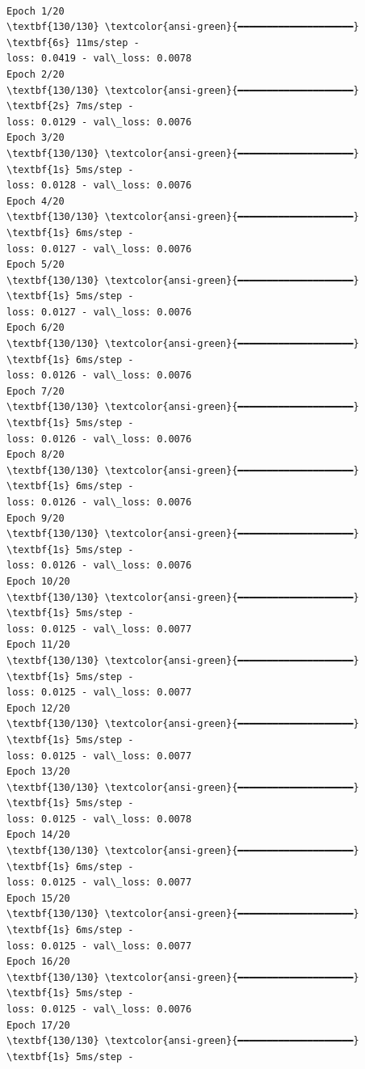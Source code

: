\documentclass[11pt]{article}
\begin{document}
    \begin{center}
    \end{center}
    { \hspace*{\fill} \\}
    
    \begin{Verbatim}[commandchars=\\\{\}]
Epoch 1/20
\textbf{130/130} \textcolor{ansi-green}{━━━━━━━━━━━━━━━━━━━━} \textbf{6s} 11ms/step -
loss: 0.0419 - val\_loss: 0.0078
Epoch 2/20
\textbf{130/130} \textcolor{ansi-green}{━━━━━━━━━━━━━━━━━━━━} \textbf{2s} 7ms/step -
loss: 0.0129 - val\_loss: 0.0076
Epoch 3/20
\textbf{130/130} \textcolor{ansi-green}{━━━━━━━━━━━━━━━━━━━━} \textbf{1s} 5ms/step -
loss: 0.0128 - val\_loss: 0.0076
Epoch 4/20
\textbf{130/130} \textcolor{ansi-green}{━━━━━━━━━━━━━━━━━━━━} \textbf{1s} 6ms/step -
loss: 0.0127 - val\_loss: 0.0076
Epoch 5/20
\textbf{130/130} \textcolor{ansi-green}{━━━━━━━━━━━━━━━━━━━━} \textbf{1s} 5ms/step -
loss: 0.0127 - val\_loss: 0.0076
Epoch 6/20
\textbf{130/130} \textcolor{ansi-green}{━━━━━━━━━━━━━━━━━━━━} \textbf{1s} 6ms/step -
loss: 0.0126 - val\_loss: 0.0076
Epoch 7/20
\textbf{130/130} \textcolor{ansi-green}{━━━━━━━━━━━━━━━━━━━━} \textbf{1s} 5ms/step -
loss: 0.0126 - val\_loss: 0.0076
Epoch 8/20
\textbf{130/130} \textcolor{ansi-green}{━━━━━━━━━━━━━━━━━━━━} \textbf{1s} 6ms/step -
loss: 0.0126 - val\_loss: 0.0076
Epoch 9/20
\textbf{130/130} \textcolor{ansi-green}{━━━━━━━━━━━━━━━━━━━━} \textbf{1s} 5ms/step -
loss: 0.0126 - val\_loss: 0.0076
Epoch 10/20
\textbf{130/130} \textcolor{ansi-green}{━━━━━━━━━━━━━━━━━━━━} \textbf{1s} 5ms/step -
loss: 0.0125 - val\_loss: 0.0077
Epoch 11/20
\textbf{130/130} \textcolor{ansi-green}{━━━━━━━━━━━━━━━━━━━━} \textbf{1s} 5ms/step -
loss: 0.0125 - val\_loss: 0.0077
Epoch 12/20
\textbf{130/130} \textcolor{ansi-green}{━━━━━━━━━━━━━━━━━━━━} \textbf{1s} 5ms/step -
loss: 0.0125 - val\_loss: 0.0077
Epoch 13/20
\textbf{130/130} \textcolor{ansi-green}{━━━━━━━━━━━━━━━━━━━━} \textbf{1s} 5ms/step -
loss: 0.0125 - val\_loss: 0.0078
Epoch 14/20
\textbf{130/130} \textcolor{ansi-green}{━━━━━━━━━━━━━━━━━━━━} \textbf{1s} 6ms/step -
loss: 0.0125 - val\_loss: 0.0077
Epoch 15/20
\textbf{130/130} \textcolor{ansi-green}{━━━━━━━━━━━━━━━━━━━━} \textbf{1s} 6ms/step -
loss: 0.0125 - val\_loss: 0.0077
Epoch 16/20
\textbf{130/130} \textcolor{ansi-green}{━━━━━━━━━━━━━━━━━━━━} \textbf{1s} 5ms/step -
loss: 0.0125 - val\_loss: 0.0076
Epoch 17/20
\textbf{130/130} \textcolor{ansi-green}{━━━━━━━━━━━━━━━━━━━━} \textbf{1s} 5ms/step -

\end{Verbatim}
\end{document}
